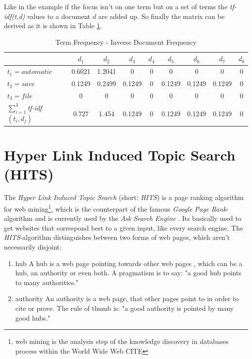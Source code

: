Like in the example if the focus isn't on one term but on a set of terms the \emph{tf-idf(t,d)} values to a document $d$ are added up. So finally the matrix can be derived as it is shown in Table \ref{tab:tfidf_table}.

\begin{table}[h]
  \centering
  \begin{tabular}{| l | c | c | c | c | c | c | c | c |}
    \hline
    & $d_1$ & $d_2$ & $d_3$ & $d_4$ & $d_5$ & $d_6$ & $d_7$ & $d_8$ \\ \hline
    $t_1 = automatic$ & 0.6021 & 1.2041 & 0 & 0 & 0 & 0 & 0 & 0 \\ \hline
    $t_2 = save$ & 0.1249 & 0.2499 & 0.1249 &0 & 0.1249 & 0.1249 & 0.1249 & 0 \\ \hline
    $t_3 = file $ & 0 & 0 & 0 & 0 & 0 & 0 & 0 & 0 \\ \hline \hline
    $\sum\nolimits_{i=1}^3$\emph{tf-idf}$(t_i,d_j)$ & 0.727 & 1.454 & 0.1249 & 0 & 0.1249 & 0.1249 & 0.1249 & 0\\ \hline
  \end{tabular}
  \label{tab:tfidf_table}
  \caption{Term Frequency - Inverse Document Frequency}
\end{table}

\section{Hyper Link Induced Topic Search (HITS)}

The \emph{Hyper Link Induced Topic Search} (short: \emph{HITS}) is a page ranking algorithm for web mining\footnote{\label{foot:1}web mining is the analysis step of the knowledge discovery in databases process within the World Wide Web CITE}, which is the counterpart of the famous \emph{Google Page Rank}-algorithm and is currently used by the \emph{Ask Search Engine} \cite{wiki:HITS}. Its basically used to get websites that correspond best to a given input, like every search engine. 
The \emph{HITS}-algorithm distinguishes between two forms of web pages, which aren't necessarily disjoint:
\begin{enumerate}
  \item hub \newline
  A hub is a web page pointing towards other web pages , which can be a hub, an authority or even both. A pragmatism is to say: "a good hub points to many authorities."
  \item authority \newline
  An authority is a web page, that other pages point to in order to cite or prove. The rule of thumb is: "a good authority is pointed by many good hubs."
\end{enumerate}

